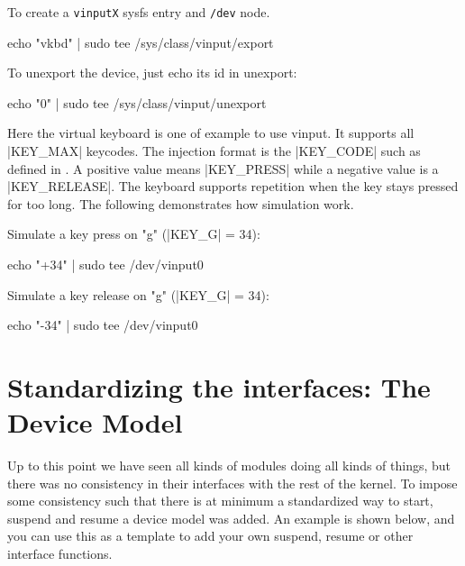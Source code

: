 \documentclass[10pt, oneside]{book}
\begin{document}
To create a \verb|vinputX| sysfs entry and \verb|/dev| node.

\begin{codebash}
echo "vkbd" | sudo tee /sys/class/vinput/export
\end{codebash}

To unexport the device, just echo its id in unexport:

\begin{codebash}
echo "0" | sudo tee /sys/class/vinput/unexport
\end{codebash}


Here the virtual keyboard is one of example to use vinput.
It supports all \cpp|KEY_MAX| keycodes.
The injection format is the \cpp|KEY_CODE| such as defined in .
A positive value means \cpp|KEY_PRESS| while a negative value is a \cpp|KEY_RELEASE|.
The keyboard supports repetition when the key stays pressed for too long.
The following demonstrates how simulation work.

Simulate a key press on "g" (\cpp|KEY_G| = 34):

\begin{codebash}
echo "+34" | sudo tee /dev/vinput0
\end{codebash}

Simulate a key release on "g" (\cpp|KEY_G| = 34):

\begin{codebash}
echo "-34" | sudo tee /dev/vinput0
\end{codebash}



\section{Standardizing the interfaces: The Device Model}
\label{sec:device_model}
Up to this point we have seen all kinds of modules doing all kinds of things, but there was no consistency in their interfaces with the rest of the kernel.
To impose some consistency such that there is at minimum a standardized way to start, suspend and resume a device model was added.
An example is shown below, and you can use this as a template to add your own suspend, resume or other interface functions.

\end{document}
